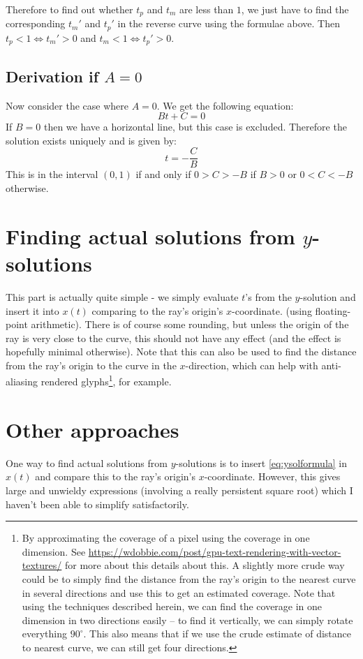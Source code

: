 \documentclass[11pt, a4paper]{article}
\begin{document}
Therefore to find out whether $t_p$ and $t_m$ are less than $1$, we just have to find the corresponding $t_m'$ and $t_p'$ in the reverse curve using the formulae above. Then $t_p < 1 \iff t_m' > 0$ and $t_m < 1 \iff t_p' > 0$.

\subsection{Derivation if $A=0$}
Now consider the case where $A = 0$. We get the following equation:
\begin{equation*}
Bt + C = 0
\end{equation*}
If $B = 0$ then we have a horizontal line, but this case is excluded. Therefore the solution exists uniquely and is given by:
\begin{equation*}
t = -\frac{C}{B}
\end{equation*}
This is in the interval $(0, 1)$ if and only if $0 > C > -B$ if $B > 0$ or $0 < C < -B$ otherwise.

\section{Finding actual solutions from $y$-solutions}
This part is actually quite simple - we simply evaluate $t$'s from the $y$-solution and insert it into $x(t)$ comparing to the ray's origin's $x$-coordinate. (using floating-point arithmetic). There is of course some rounding, but unless the origin of the ray is very close to the curve, this should not have any effect (and the effect is hopefully minimal otherwise). Note that this can also be used to find the distance from the ray's origin to the curve in the $x$-direction, which can help with anti-aliasing rendered glyphs\footnote{By approximating the coverage of a pixel using the coverage in one dimension.
See \url{https://wdobbie.com/post/gpu-text-rendering-with-vector-textures/} for more about this details about this. A slightly more crude way could be to simply find the distance from the ray's origin to the nearest curve in several directions and use this to get an estimated coverage. Note that using the techniques described herein, we can find the coverage in one dimension in two directions easily -- to find it vertically, we can simply rotate everything $90^\circ$. This also means that if we use the crude estimate of distance to nearest curve, we can still get four directions.}, for example.

\section{Other approaches}
One way to find actual solutions from $y$-solutions is to insert \eqref{eq:ysolformula} in $x(t)$ and compare this to the ray's origin's $x$-coordinate. However, this gives large and unwieldy expressions (involving a really persistent square root) which I haven't been able to simplify satisfactorily.
\end{document}
